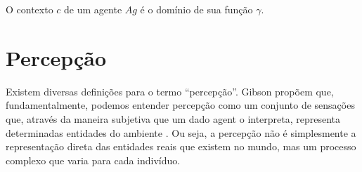 \begin{definition}
    O contexto $c$ de um agente $Ag$ é o domínio de sua função $\gamma$.
    \label{definition::context}
\end{definition}{}

\section{Percepção}

Existem diversas definições para o termo ``percepção''. Gibson propõem que, fundamentalmente, podemos entender percepção como um conjunto de sensações que, através da maneira subjetiva que um dado agent o interpreta, representa determinadas entidades do ambiente \cite{gibson1950perception}. Ou seja, a percepção não é simplesmente a representação direta das entidades reais que existem no mundo, mas um processo complexo que varia para cada indivíduo.

